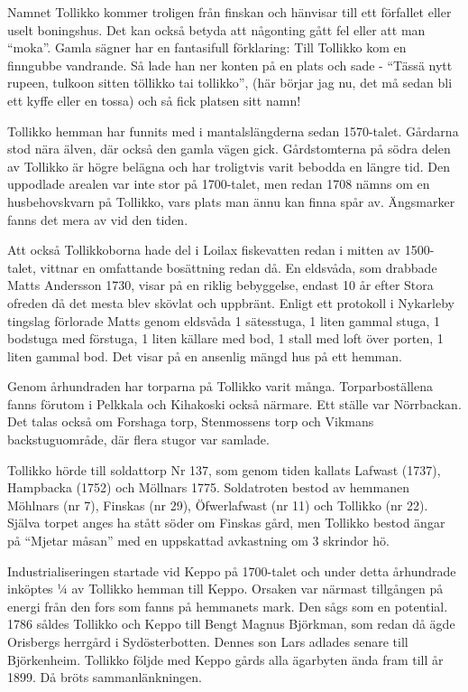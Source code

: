 
Namnet Tollikko kommer troligen från finskan och hänvisar till ett förfallet eller uselt boningshus. Det kan också betyda att någonting gått fel eller att man ``moka''. Gamla sägner har en  fantasifull förklaring: Till Tollikko kom en finngubbe vandrande. Så lade han ner konten på en plats och sade - ``Tässä nytt rupeen, tulkoon sitten töllikko tai tollikko'', (här börjar jag nu, det må sedan bli ett kyffe eller en tossa) och så fick platsen sitt namn!

Tollikko hemman har funnits med i mantalslängderna sedan 1570-talet. Gårdarna stod nära älven, där också den gamla vägen gick. Gårdstomterna på södra delen av Tollikko är högre belägna och har troligtvis varit bebodda en längre tid. Den uppodlade arealen var inte stor på 1700-talet, men redan 1708 nämns om en husbehovskvarn på Tollikko, vars plats man ännu kan finna spår av. Ängsmarker fanns det mera av vid den tiden.

Att också Tollikkoborna hade del i Loilax fiskevatten redan i mitten av 1500-talet, vittnar en omfattande bosättning redan då. En eldsvåda, som drabbade Matts Andersson 1730, visar på en riklig bebyggelse, endast 10 år efter Stora ofreden då det mesta blev skövlat och uppbränt. Enligt ett protokoll i Nykarleby tingslag förlorade Matts genom eldsvåda 1 sätesstuga, 1 liten gammal stuga, 1 bodstuga med förstuga, 1 liten källare med bod, 1 stall med loft över porten, 1 liten gammal bod. Det visar på en ansenlig mängd hus på ett hemman.

Genom århundraden har torparna på Tollikko varit många. Torparboställena fanns förutom i Pelkkala och Kihakoski också närmare. Ett ställe var Nörrbackan. Det talas också om Forshaga torp, Stenmossens torp och Vikmans backstuguområde, där flera stugor var samlade.

Tollikko hörde till soldattorp Nr 137, som genom tiden kallats Lafwast (1737), Hampbacka (1752) och Möllnars 1775. Soldatroten bestod av hemmanen Möhlnars (nr 7), Finskas (nr 29), Öfwerlafwast (nr 11) och Tollikko (nr 22). Själva torpet anges ha stått söder om Finskas gård, men Tollikko bestod ängar på ``Mjetar måsan'' med en uppskattad avkastning om 3 skrindor hö.

Industrialiseringen startade vid Keppo på 1700-talet och under detta århundrade inköptes ¼ av Tollikko hemman till Keppo. Orsaken var närmast tillgången på energi från den fors som fanns på hemmanets mark. Den sågs som en potential. 1786 såldes Tollikko och Keppo till Bengt Magnus Björkman, som redan då ägde Orisbergs herrgård i Sydösterbotten. Dennes son Lars adlades senare till Björkenheim. Tollikko följde med Keppo gårds alla ägarbyten ända fram till år 1899. Då bröts sammanlänkningen.


